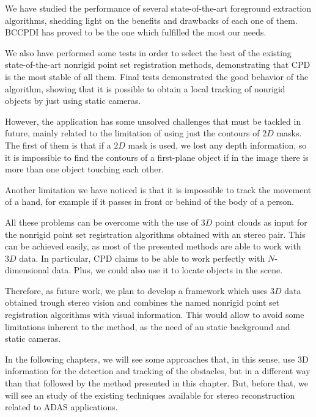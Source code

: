We have studied the performance of several state-of-the-art foreground extraction algorithms, shedding light on the 
benefits and drawbacks of each one of them. BCCPDI has proved to be the one which fulfilled the most our needs. 

We also have performed some tests in order to select the best of the existing state-of-the-art nonrigid point set registration methods, demonstrating that CPD is the most stable of all them. Final tests demonstrated the good behavior of the algorithm, showing that it is possible to obtain a local tracking of nonrigid objects by just using static cameras.

However, the application has some unsolved challenges that must be tackled in future, mainly related to the 
limitation of using just the contours of $2D$ masks. The first of them is that if a  $2D$ mask is used, we lost any 
depth information, so it is impossible to find the contours of a first-plane object if in the image there is more than 
one object touching each other. 

Another limitation we have noticed is that it is impossible to track the movement of a hand, for example if it 
passes in front or behind of the body of a person. 

All these problems can be overcome with the use of $3D$ point clouds as input for the nonrigid point set registration 
algorithms obtained with an stereo pair. This can be achieved easily, as most of the presented methods are able to work 
with $3D$ data. In particular, CPD claims to be able to work perfectly with $N$-dimensional data. Plus, we could also 
use it to locate objects in the scene.

Therefore, as future work, we plan to develop a framework which uses $3D$ data obtained trough stereo vision and 
combines the named nonrigid point set registration algorithms with visual information. This would allow to avoid some limitations inherent to the method, as the need of an static background and static cameras.

In the following chapters, we will see some approaches that, in this sense, use 3D information for the detection and tracking of the obstacles, but in a different way than that followed by the method presented in this chapter. But, before that, we will see an study of the existing techniques available for stereo reconstruction related to \ac{ADAS} applications.





